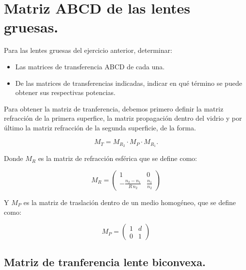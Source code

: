 \documentclass[a4paper,12pt]{article} %
\begin{document}
\section{Matriz ABCD de las lentes gruesas.}

\begin{justify}
	Para las lentes gruesas del ejercicio anterior, determinar:
\end{justify}

\begin{itemize}
	\item Las matrices de transferencia ABCD de cada una. 
	\item De las matrices de transferencias indicadas, indicar en qué término se puede obtener sus respectivas potencias.  
\end{itemize}

\vspace{\baselineskip}

\begin{justify}
	Para obtener la matriz de tranferencia, debemos primero definir la matriz refracción de la primera superfice, la matriz propagación dentro del vidrio y por último la matriz refracción de la segunda superficie, de la forma.
\end{justify}

\[M_T = M_{R_2} \cdot M_P \cdot M_{R_1}.\]

\begin{justify}
	Donde \(M_R\) es la matriz de refracción esférica que se define como:
\end{justify}

\[ M_R =
\begin{pmatrix}
1 & 0 \\
-\frac{n_2-n_1}{R \, n_2} & \frac{n_1}{n_2}
\end{pmatrix}
\]

\begin{justify}
	Y \(M_P\) es la matriz de traslación dentro de un medio homogéneo, que se define como:
\end{justify}

\[ M_P =
\begin{pmatrix}
1 & d \\
0 & 1
\end{pmatrix}
\]


\subsection{Matriz de tranferencia lente biconvexa.}
\end{document}
